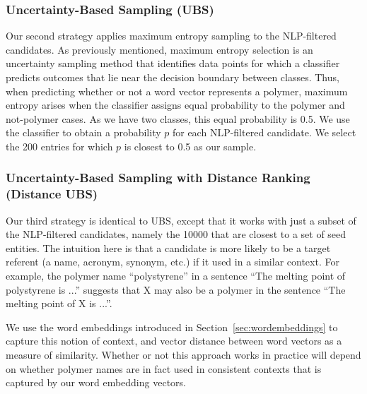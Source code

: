 \subsubsection{Uncertainty-Based Sampling (UBS)}
Our second strategy applies maximum entropy sampling to the NLP-filtered candidates. %
As previously mentioned, maximum entropy selection is an uncertainty sampling method that
identifies data points for which a classifier predicts outcomes that lie near the decision boundary 
between classes. 
Thus, when predicting whether or not a word vector represents a polymer, 
maximum entropy arises when the classifier assigns equal probability to the polymer and not-polymer cases.
As we have two classes, this equal probability is 0.5.
We use the classifier to obtain a probability $p$ for each NLP-filtered candidate. 
We select the 200 entries for which $p$ is closest to 0.5 as our sample.

\subsubsection{Uncertainty-Based Sampling with Distance Ranking (Distance UBS)}
Our third strategy is identical to UBS, except that it works with just a subset of the NLP-filtered candidates,
namely the \num{10000} that are closest to a set of seed entities. 
The intuition here is that a candidate is more likely to be a target referent 
(a name, acronym, synonym, etc.) if it used in a similar context.
For example, the polymer name ``polystyrene'' in a sentence ``The
melting point of polystyrene is ...'' suggests that X may also be a polymer in the
sentence ``The melting point of X is ...''.

We use the word embeddings introduced in Section~\ref{sec:wordembeddings} to capture this notion of context,
and vector distance between word vectors as a measure of similarity.
Whether or not this approach works in practice will depend on whether 
polymer names are in fact used in consistent contexts that is captured by our 
word embedding  vectors. 

